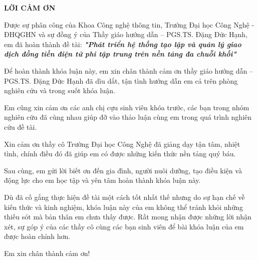 \setlength{\parindent}{1cm}
\setcounter{page}{1}

\begin{center}
  \textbf{\large{LỜI CẢM ƠN}	}
\end{center}

Được sự phân công của Khoa Công nghệ thông tin, Trường Đại học Công Nghệ -
ĐHQGHN và sự đồng ý của Thầy giáo hướng dẫn – PGS.TS. Đặng Đức Hạnh, em đã hoàn
thành đề tài: \textbf{\textit{"Phát triển hệ thống tạo lập và quản lý giao dịch
    đồng tiền điện tử phi tập trung trên nền tảng đa chuỗi khối"}}

Để hoàn thành khóa luận này, em xin chân thành cảm ơn thầy giáo hướng dẫn –
PGS.TS. Đặng Đức Hạnh đã dìu dắt, tận tình hướng dẫn em cả trên phòng nghiên
cứu và trong suốt khóa luận.

Em cũng xin cảm ơn các anh chị cựu sinh viên khóa trước, các bạn trong nhóm
nghiên cứu đã cùng nhau giúp đỡ vào thảo luận cùng em trong quá trình nghiên
cứu đề
tài.

Xin cảm ơn thầy cô Trường Đại học Công Nghệ đã giảng dạy tận tâm, nhiệt tình,
chính điều đó đã giúp em có được những kiến thức nền tảng quý báu.

Sau cùng, em gửi lời biết ơn đến gia đình, người nuôi dưỡng, tạo điều kiện và
động
lực cho em học tập và yên tâm hoàn thành khóa luận này.

Dù đã cố gắng thực hiện đề tài một cách tốt nhất thế nhưng do sự hạn chế về kiến thức và
kinh nghiệm,
khóa luận này của em không thể tránh khỏi những thiếu sót mà bản thân em chưa
thấy
được. Rất mong nhận được những lời nhận xét, sự góp ý của các thầy cô cùng các
bạn sinh
viên để bài khóa luận của em được hoàn chỉnh hơn.

Em xin chân thành cảm ơn!
